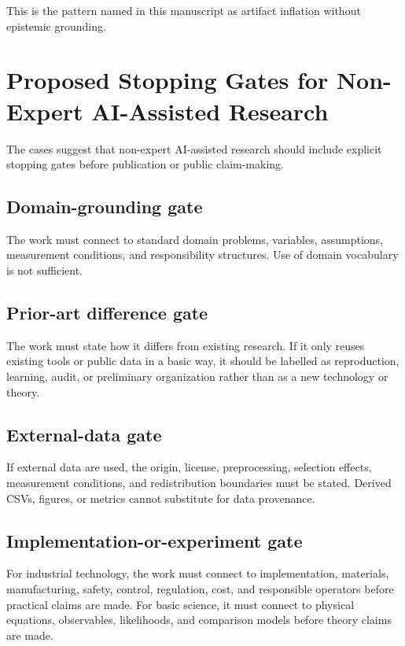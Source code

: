 \documentclass[a4paper,11pt]{article}
\begin{document}
This is the pattern named in this manuscript as artifact inflation without epistemic grounding.

\section{Proposed Stopping Gates for Non-Expert AI-Assisted Research}

The cases suggest that non-expert AI-assisted research should include explicit stopping gates before publication or public claim-making.

\subsection{Domain-grounding gate}

The work must connect to standard domain problems, variables, assumptions, measurement conditions, and responsibility structures. Use of domain vocabulary is not sufficient.

\subsection{Prior-art difference gate}

The work must state how it differs from existing research. If it only reuses existing tools or public data in a basic way, it should be labelled as reproduction, learning, audit, or preliminary organization rather than as a new technology or theory.

\subsection{External-data gate}

If external data are used, the origin, license, preprocessing, selection effects, measurement conditions, and redistribution boundaries must be stated. Derived CSVs, figures, or metrics cannot substitute for data provenance.

\subsection{Implementation-or-experiment gate}

For industrial technology, the work must connect to implementation, materials, manufacturing, safety, control, regulation, cost, and responsible operators before practical claims are made. For basic science, it must connect to physical equations, observables, likelihoods, and comparison models before theory claims are made.
\end{document}
